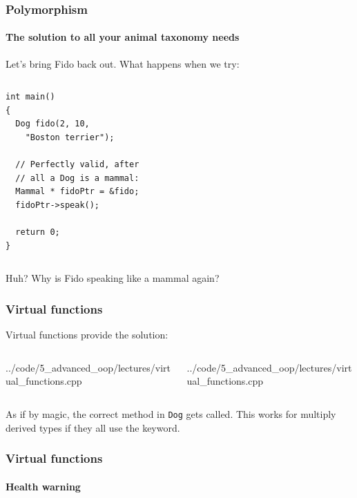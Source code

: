 \documentclass[handout]{beamer}
\begin{document}
\begin{frame}[fragile]
  \frametitle{Polymorphism}
  \framesubtitle{The solution to all your animal taxonomy needs}

	Let's bring Fido back out.  What happens when we try:
  \begin{columns}[t]
    \begin{column}[T]{0.48\linewidth}
  		\begin{lstlisting}[aboveskip=0pt]
int main()
{
  Dog fido(2, 10,
    "Boston terrier");
    
  // Perfectly valid, after
  // all a Dog is a mammal:  
  Mammal * fidoPtr = &fido;
  fidoPtr->speak();

  return 0;
}
  		\end{lstlisting}
  	\end{column}
  	\pause
  	\begin{column}[T]{0.48\linewidth}
  	\end{column}
  \end{columns}
  \pause
  Huh?  Why is Fido speaking like a mammal again?

\end{frame}

\begin{frame}[fragile]
  \frametitle{Virtual functions}
  
  Virtual functions provide the solution:
  \begin{columns}[t]
    \begin{column}[T]{0.48\linewidth}
    		{../code/5_advanced_oop/lectures/virtual_functions.cpp}
    \end{column}
    \pause
		\begin{column}[T]{0.48\linewidth}
    		{../code/5_advanced_oop/lectures/virtual_functions.cpp}
		\end{column}
	\end{columns}
	\pause
	As if by magic, the correct method in \texttt{Dog} gets called.  This works for multiply derived types if they all use the  keyword.

\end{frame}

\begin{frame}[fragile]
  \frametitle{Virtual functions}
  \framesubtitle{Health warning}
  

\end{frame}
\end{document}
